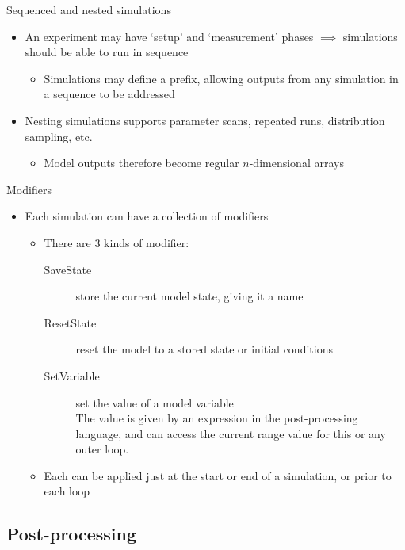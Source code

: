 \documentclass[t,xcolor={usenames,dvipsnames}]{beamer}
\newcommand{\subitem}[1]{\begin{itemize}[<.->]\item #1 \end{itemize}}
\begin{document}
\begin{frame}{Sequenced and nested simulations}
\begin{itemize}[<+->]
\item An experiment may have `setup' and `measurement' phases $\implies$ simulations should be able to run in sequence
  \subitem{Simulations may define a prefix, allowing outputs from any simulation in a sequence to be addressed}
\item Nesting simulations supports parameter scans, repeated runs, distribution sampling, etc.
  \subitem{\alert{Model outputs therefore become regular $n$-dimensional arrays}}
\end{itemize}
\end{frame}

\begin{frame}{Modifiers}
\begin{itemize}
\item Each simulation can have a collection of \alert{modifiers}
  \begin{itemize}
  \item There are 3 kinds of modifier:
    \begin{description}
    \item[SaveState] store the current model state, giving it a name
    \item[ResetState] reset the model to a stored state or initial conditions
    \item[SetVariable] set the value of a model variable\\
      The value is given by an expression in the post-processing language,
      and can access the current range value for this or any outer loop.
    \end{description}
  \item Each can be applied just at the start or end of a simulation, or prior to each loop
  \end{itemize}
\end{itemize}
\end{frame}

\subsection{Post-processing}
\end{document}
